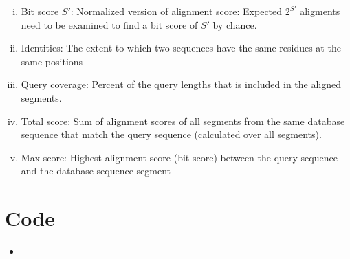 \documentclass{article}
\newcommand{\matlabscript}[2]
  {\begin{itemize}\item[]\end{itemize}}
\begin{document}
\begin{spacing}{1.1}
{\begin{enumerate}[(a)]
\begin{enumerate}[i.]
          \item Bit score $S'$: Normalized version of alignment score: Expected $2^{S'}$ aligments need to be examined to find a bit score of $S'$ by chance.
          \item Identities: The extent to which two sequences have the same residues at the same positions
          \item Query coverage: Percent of the query lengths that is included in the aligned segments.
          \item Total score: Sum of alignment scores of all segments from the same database sequence that match the query sequence (calculated over all segments).
          \item Max score: Highest alignment score (bit score) between the query sequence and the database sequence segment
        \end{enumerate}
    \end{enumerate}
  }
\appendix
\section{Code}
\matlabscript{ex3}{}
\end{spacing}


\end{document}

